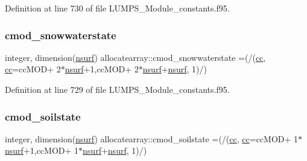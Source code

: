 Definition at line 730 of file L\+U\+M\+P\+S\+\_\+\+Module\+\_\+constants.\+f95.

\mbox{\label{namespaceallocatearray_a7444244e175c845f71646708c7fc0f00}} 
\subsubsection{\texorpdfstring{cmod\+\_\+snowwaterstate}{cmod\_snowwaterstate}}
{\footnotesize\ttfamily integer, dimension(\hyperlink{namespaceallocatearray_acd22f92a06f7e9a2a91426b3dc99fdb0}{nsurf}) allocatearray\+::cmod\+\_\+snowwaterstate =(/(\hyperlink{namespaceallocatearray_ac863c81704eb507dee10f5e10741e10c}{cc}, \hyperlink{namespaceallocatearray_ac863c81704eb507dee10f5e10741e10c}{cc}=cc\+M\+OD+ 2$\ast$\hyperlink{namespaceallocatearray_acd22f92a06f7e9a2a91426b3dc99fdb0}{nsurf}+1,cc\+M\+OD+ 2$\ast$\hyperlink{namespaceallocatearray_acd22f92a06f7e9a2a91426b3dc99fdb0}{nsurf}+\hyperlink{namespaceallocatearray_acd22f92a06f7e9a2a91426b3dc99fdb0}{nsurf}, 1)/)}



Definition at line 729 of file L\+U\+M\+P\+S\+\_\+\+Module\+\_\+constants.\+f95.

\mbox{\label{namespaceallocatearray_abc11b77f7e2b79059d31a63ef02209f7}} 
\subsubsection{\texorpdfstring{cmod\+\_\+soilstate}{cmod\_soilstate}}
{\footnotesize\ttfamily integer, dimension(\hyperlink{namespaceallocatearray_acd22f92a06f7e9a2a91426b3dc99fdb0}{nsurf}) allocatearray\+::cmod\+\_\+soilstate =(/(\hyperlink{namespaceallocatearray_ac863c81704eb507dee10f5e10741e10c}{cc}, \hyperlink{namespaceallocatearray_ac863c81704eb507dee10f5e10741e10c}{cc}=cc\+M\+OD+ 1$\ast$\hyperlink{namespaceallocatearray_acd22f92a06f7e9a2a91426b3dc99fdb0}{nsurf}+1,cc\+M\+OD+ 1$\ast$\hyperlink{namespaceallocatearray_acd22f92a06f7e9a2a91426b3dc99fdb0}{nsurf}+\hyperlink{namespaceallocatearray_acd22f92a06f7e9a2a91426b3dc99fdb0}{nsurf}, 1)/)}



